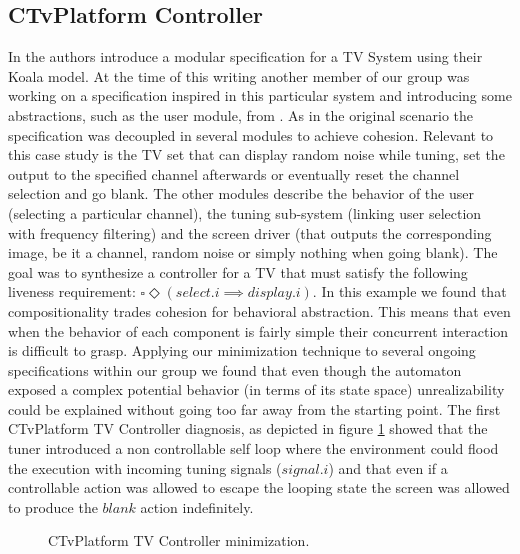 \subsection{CTvPlatform Controller}\label{section:validation-ctv}
In \cite{DBLP:journals/computer/OmmeringLKM00} the authors
introduce a modular specification for a TV System using
their Koala model. At the time of this writing  
another member of our group was working on a 
specification inspired in this particular system
and introducing some abstractions, such as the user 
module, from \cite{DBLP:conf/sigsoft/UchitelCKM04}.
As in the original scenario the specification was decoupled
in several modules to achieve cohesion.  
Relevant to this case study is the
TV set that can display random noise while
tuning, set the output to the specified channel afterwards
or eventually reset the channel selection and
go blank. The other modules describe the
behavior of the user (selecting a particular channel), 
the tuning sub-system (linking user selection with
frequency filtering) and the screen driver (that outputs
the corresponding image, be it a channel, random noise
or simply nothing when going blank). 
The goal was to synthesize a 
controller for a TV that must satisfy the following
liveness requirement: $\square \Diamond (select.i \implies display.i)$. 
In this example we found that 
compositionality trades cohesion for behavioral abstraction.
This means that even when the behavior of each component is fairly simple their concurrent interaction is difficult to
grasp.  Applying our minimization technique to several ongoing
specifications within our group we found that even though
the automaton exposed a complex potential behavior (in terms
of its state space) unrealizability could be explained without going too far away from the starting point.
The first CTvPlatform TV Controller diagnosis, as depicted in figure
\ref{fig:tv-controller-minimization} showed that the tuner
introduced a non controllable self loop where the environment
could flood the execution with incoming tuning signals ($signal.i$) and that
even if a controllable action was allowed to escape the
looping state the screen was allowed to produce 
the $blank$ action indefinitely. \\
\begin{figure}[bt]
\centering
\SmallPicture
{}
\vspace*{-2mm}
\caption{CTvPlatform TV Controller minimization.}
\label{fig:tv-controller-minimization}
\vspace*{-4mm}
\MediumPicture
\end{figure}

